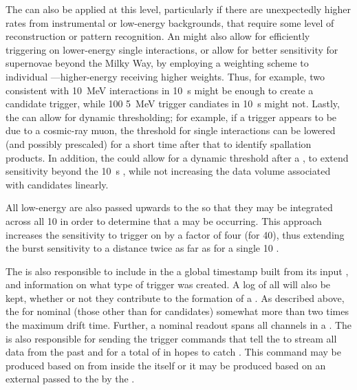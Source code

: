 	
The  can also be applied at this level, particularly if
there are unexpectedly higher rates from instrumental or low-energy
backgrounds, that require some level of reconstruction or pattern
recognition. 
An  might also allow for efficiently triggering on
lower-energy single interactions, or allow for better sensitivity for
supernovae beyond the Milky Way, by employing a weighting scheme to
individual ---higher-energy
 receiving higher weights. 
Thus, for example, two  consistent with
\SI{10}{\MeV} interactions in \SI{10}{\s} might be enough to create a
 candidate trigger, while 100 \SI{5}{\MeV} trigger
candiates in \SI{10}{\s} might not.
Lastly, the  can allow for dynamic thresholding; for
example, if a trigger appears to be due to a cosmic-ray muon, the
threshold for single interactions can be lowered (and possibly
prescaled) for a short time after that to identify spallation
products. 
In addition, the  could allow for a dynamic threshold after
a , to extend sensitivity beyond the \SI{10}{\s}
 , while not increasing the data
volume associated with  candidates linearly. 

All low-energy  are also passed upwards to the
 so that they may be integrated across all \SI{10}{\kton}
 in order to determine that a  may be
occurring. 
This approach increases the sensitivity to trigger on  by
a factor of four (for \SI{40}{\kton}), thus extending the burst
sensitivity to a distance twice as far as for a single \SI{10}{\kton}
. 

	
The  is also responsible to include in the
 a global timestamp built from its input
, and information on what type of trigger was
created. 
A log of all  will also be kept, whether or not
they contribute to the formation of a . 
As described above, the  for nominal
 (those other than for  candidates)
somewhat more than two times the maximum drift time. 
Further, a nominal readout spans all channels in a . 
The  is also responsible for sending the trigger commands
that tell the  to stream all data from the past
\snbpretime and for a total of \snbtime in hopes to catch
.
This command may be produced based on  from
inside the  itself or it may be produced based on an external
  passed to the  by the
.
